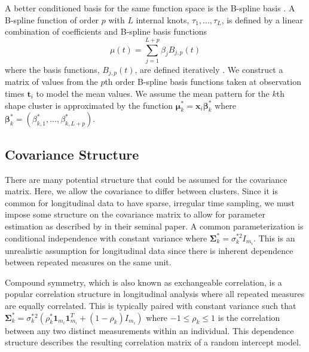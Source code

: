 \documentclass[12pt]{article}
\newcommand{\B}[0]{\mathbf}
\newcommand{\bs}[0]{\boldsymbol}
\begin{document}
A better conditioned basis for the same function space is the B-spline basis \cite{deboor1978, schumaker1981,curry1966, de1976}. A B-spline function of order $p$ with $L$ internal knots, $\tau_{1},...,\tau_{L}$, is defined by a linear combination of coefficients and B-spline basis functions
$$\mu(t) = \sum^{L+p}_{j=1} \beta_j B_{j,p}(t)$$
where the basis functions, $B_{j,p}(t)$, are defined iteratively \cite{deboor1972,cox1972}. We construct a matrix  of values from the $p$th order B-spline basis functions taken at observation times $\B t_{i}$ to model the mean values. We assume the mean pattern for the $k$th shape cluster is approximated by the function $\bs\mu^{*}_{k}=\B x_{i}\bs\beta^{*}_{k}$ where $\bs\beta^{*}_{k}=(\beta^{*}_{k,1},...,\beta^{*}_{k, L+p}).$  

\subsection{Covariance Structure}
There are many potential structure that could be assumed for the covariance matrix. Here, we allow the covariance to differ between clusters. Since it is common for longitudinal data to have sparse, irregular time sampling, we must impose some structure on the covariance matrix to allow for parameter estimation as described by \textcite{jennrich1986} in their seminal paper. A common parameterization is conditional independence with constant variance where $\B \Sigma^{*}_{k}= \sigma_{k}^{*2}I_{m_{i}}$. This is an unrealistic assumption for longitudinal data since there is inherent dependence between repeated measures on the same unit. 

Compound symmetry, which is also known as exchangeable correlation, is a popular correlation structure in longitudinal analysis where all repeated measures are equally correlated. This is typically paired with constant variance such that $\B \Sigma^{*}_{k} = \sigma^{*}_{k}^{2}(\rho^{*}_{k}\B1_{m_{i}}\B1_{m_{i}}^{T}+(1-\rho_{k})I_{m_{i}})$ where $-1\leq\rho_{k}\leq 1$ is the correlation between any two distinct measurements within an individual. This dependence structure describes the resulting correlation matrix of a random intercept model.
\end{document}
